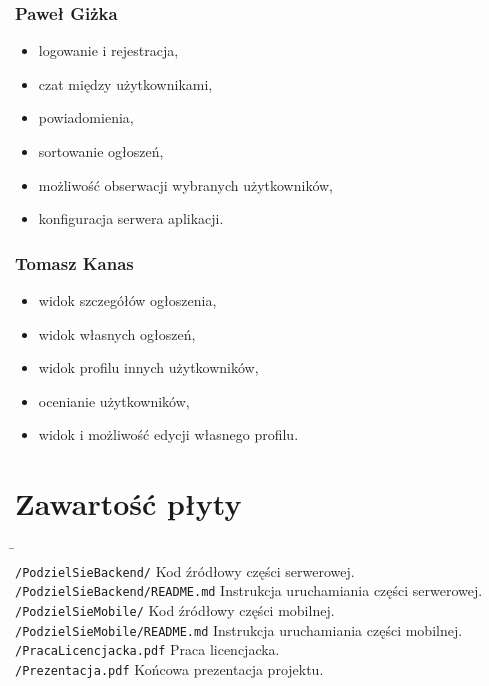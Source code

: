 \documentclass[licencjacka]{pracamgr}
\begin{document}
\subsection{Paweł Giżka}
\begin{itemize}
\setlength\itemsep{-0.2em}
    \item logowanie i rejestracja,
    \item czat między użytkownikami,
    \item powiadomienia,
    \item sortowanie ogłoszeń,
    \item możliwość obserwacji wybranych użytkowników,
    \item konfiguracja serwera aplikacji.
\end{itemize}{}

\subsection{Tomasz Kanas}
\begin{itemize}
\setlength\itemsep{-0.2em}
    \item widok szczegółów ogłoszenia,
    \item widok własnych ogłoszeń,
    \item widok profilu innych użytkowników,
    \item ocenianie użytkowników,
    \item widok i możliwość edycji własnego profilu.
\end{itemize}{}

\chapter{Zawartość płyty}\label{r:build}
\begin{tabbing}
      \hspace{20em} \=   \hspace{10em} \\
    \texttt{/PodzielSieBackend/} \> Kod źródłowy części serwerowej. \\
    \texttt{/PodzielSieBackend/README.md} \> Instrukcja uruchamiania części serwerowej. \\
    \texttt{/PodzielSieMobile/} \> Kod źródłowy części mobilnej. \\
    \texttt{/PodzielSieMobile/README.md} \> Instrukcja uruchamiania części mobilnej. \\
    \texttt{/PracaLicencjacka.pdf} \> Praca licencjacka. \\
    \texttt{/Prezentacja.pdf} \> Końcowa prezentacja projektu. \\
\end{tabbing}
\end{document}
